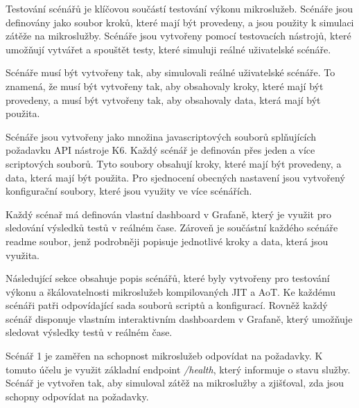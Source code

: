 

Testování scénářů je klíčovou součástí testování výkonu mikroslužeb. Scénáře jsou definovány jako soubor kroků, které mají být provedeny, a jsou použity k simulaci zátěže na mikroslužby. Scénáře jsou vytvořeny pomocí testovacích nástrojů, které umožňují vytvářet a spouštět testy, které simuluji reálné uživatelské scénáře.


Scénáře musí být vytvořeny tak, aby simulovali reálné uživatelské scénáře. To znamená, že musí být vytvořeny tak, aby obsahovaly kroky, které mají být provedeny, a musí být vytvořeny tak, aby obsahovaly data, která mají být použita.


Scénáře jsou vytvořeny jako množina javascriptových souborů splňujících požadavku API nástroje K6. Každý scénář je definován přes jeden a více scriptových souborů. Tyto soubory obsahují kroky, které mají být provedeny, a data, která mají být použita. Pro sjednocení obecných nastavení jsou vytvořený konfigurační soubory, které jsou využity ve více scénářích.

Každý scénař má definován vlastní dashboard v Grafaně, který je využit pro sledování výsledků testů v reálném čase. Zároveň je součástní každého scénáře readme soubor, jenž podrobněji popisuje jednotlivé kroky a data, která jsou využita.


Následující sekce obsahuje popis scénářů, které byly vytvořeny pro testování výkonu a škálovatelnosti mikroslužeb kompilovaných JIT a AoT. Ke každému scénáři patři odpovídající sada souborů scriptů a konfigurací. Rovněž každý scénář disponuje vlastním interaktivním dashboardem v Grafaně, který umožňuje sledovat výsledky testů v reálném čase.


Scénář 1 je zaměřen na schopnost mikroslužeb odpovídat na požadavky. K tomuto účelu je využit základní endpoint \emph{/health}, který informuje o stavu služby. Scénář je vytvořen tak, aby simuloval zátěž na mikroslužby a zjišťoval, zda jsou schopny odpovídat na požadavky.

